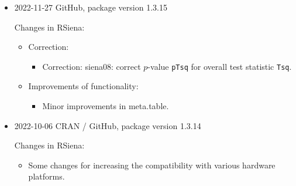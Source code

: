 \documentclass[a4paper,fleqn,11pt]{article}
\newcommand{\+}{\, + \,}
\newcommand{\sfn}[1]{\textsf{#1}}
\begin{document}
\begin{small}
\begin{itemize} %

\item 2022-11-27 GitHub, package version 1.3.15

Changes in RSiena:
\begin{itemize}
\item Correction:
    \begin{itemize}
    \item Correction: \sfn{siena08}: correct $p$-value \texttt{pTsq} for overall 
        test statistic \texttt{Tsq}.
    \end{itemize}
\item Improvements of functionality:
    \begin{itemize}
    \item Minor improvements in  \sfn{meta.table}.
    \end{itemize}
\end{itemize}


\item 2022-10-06 CRAN / GitHub, package version 1.3.14

Changes in RSiena:
\begin{itemize}
\item Some changes for increasing the compatibility with various
      hardware platforms.
\end{itemize}


\end{itemize}
\end{small}
\end{document}
